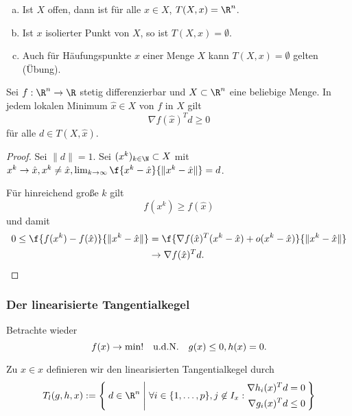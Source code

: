 \begin{ex} \label{3.14}
	\begin{enumerate}[(a)]
		\item
			Ist $X$ offen, dann ist für alle $x \in X$, $T(X, x) = \R^n$.
		\item
			Ist $x$ isolierter Punkt von $X$, so ist $T(X, x) = \emptyset$.
		\item
			Auch für Häufungspunkte $x$ einer Menge $X$ kann $T(X, x) = \emptyset$ gelten (Übung).
	\end{enumerate}
\end{ex}

\begin{st} \label{3.15}
	Sei $f: \R^n \to \R$ stetig differenzierbar und $X \subset \R^n$ eine beliebige Menge.
	In jedem lokalen Minimum $\hat x \in X$ von $f$ in $X$ gilt
	\[
		\nabla f(\hat x)^T d \ge 0
	\]
	für alle $d \in T(X, \hat x)$.
	\begin{proof}
		Sei \oBdA $\|d\| = 1$.
		Sei $(x^k)_{k\in\N} \subset X$ mit $x^k \to \hat x, x^k \neq \hat x, \lim_{k\to \infty} \f{x^k-\hat x}{\|x^k - \hat x\|} = d$.

		Für hinreichend große $k$ gilt
		\[
			f(x^k) \ge f(\hat x)
		\]
		und damit
		\begin{align*}
			0 \le \f {f(x^k) - f(\hat x)}{\|x^k - \hat x\|}
			&= \f{\nabla f(\hat x)^T (x^k - \hat x) + o(x^k - \hat x)}{\|x^k - \hat x\|} \\
			&\to \nabla f(\hat x)^T d.
		\end{align*}
	\end{proof}
\end{st}

\subsubsection{Der linearisierte Tangentialkegel}

Betrachte wieder
\[
	f(x) \to \min! \quad\text{u.d.N.}\quad g(x) \le 0, h(x) = 0.
\]

\begin{df} \label{3.16}
	Zu $x \in x$ definieren wir den linearisierten Tangentialkegel durch
	\[
		T_l(g,h,x) := \Set{ d \in \R^n | \forall i \in \{1,\dotsc,p\}, j \not\in I_x :
			\begin{aligned}
				\nabla h_i(x)^T d &= 0 \\
				\nabla g_i(x)^T d &\le 0
			\end{aligned}
		}
	\]
\end{df}

